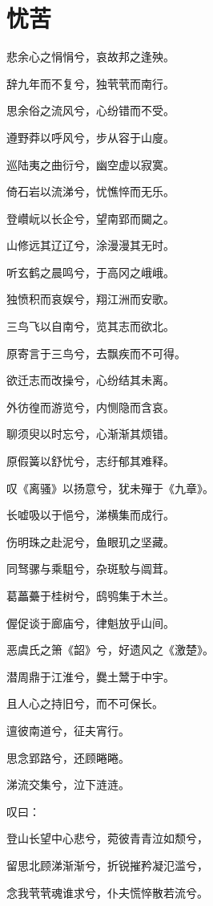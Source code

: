 \documentclass[UTF8,titlepage,oneside]{ctexbook}
\begin{document}
\section*{忧苦}
\begin{center}
	
	悲余心之悁悁兮，哀故邦之逢殃。
	
	辞九年而不复兮，独茕茕而南行。
	
	思余俗之流风兮，心纷错而不受。
	
	遵野莽以呼风兮，步从容于山廋。
	
	巡陆夷之曲衍兮，幽空虚以寂寞。
	
	倚石岩以流涕兮，忧憔悴而无乐。
	
	登巑岏以长企兮，望南郢而闚之。
	
	山修远其辽辽兮，涂漫漫其无时。
	
	听玄鹤之晨鸣兮，于高冈之峨峨。
	
	独愤积而哀娱兮，翔江洲而安歌。
	
	三鸟飞以自南兮，览其志而欲北。
	
	原寄言于三鸟兮，去飘疾而不可得。
	
	欲迁志而改操兮，心纷结其未离。
	
	外彷徨而游览兮，内恻隐而含哀。
	
	聊须臾以时忘兮，心渐渐其烦错。
	
	原假簧以舒忧兮，志纡郁其难释。
	
	叹《离骚》以扬意兮，犹未殫于《九章》。
	
	长嘘吸以于悒兮，涕横集而成行。
	
	伤明珠之赴泥兮，鱼眼玑之坚藏。
	
	同驽骡与乘駔兮，杂斑駮与阘茸。
	
	葛藟虆于桂树兮，鸱鸮集于木兰。
	
	偓促谈于廊庙兮，律魁放乎山间。
	
	恶虞氏之箫《韶》兮，好遗风之《激楚》。
	
	潜周鼎于江淮兮，爨土鬵于中宇。
	
	且人心之持旧兮，而不可保长。
	
	邅彼南道兮，征夫宵行。
	
	思念郢路兮，还顾睠睠。
	
	涕流交集兮，泣下涟涟。
	
	叹曰：
	
	登山长望中心悲兮，菀彼青青泣如颓兮，
	
	留思北顾涕渐渐兮，折锐摧矜凝氾滥兮，
	
	念我茕茕魂谁求兮，仆夫慌悴散若流兮。
	
	
\end{center}
\end{document}
